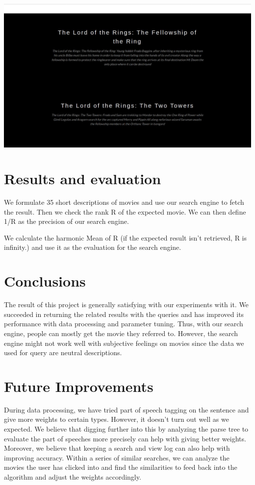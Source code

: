 \documentclass[letterpaper,10pt]{article}
\newenvironment{Figure}
  {\par\medskip\noindent\minipage{\linewidth}}
  {\endminipage\par\medskip}
\begin{document}
\begin{multicols}{2}
	\begin{Figure}
    	\center
  		\includegraphics[width=0.5\linewidth]{interface1.jpg}
	\end{Figure}

    \section{Results and evaluation}

    We formulate 35 short descriptions of movies and use our search engine to fetch the result. Then we check the rank R of the expected movie. We can then define 1/R as the precision of our search engine.

    We calculate the harmonic Mean of R (if the expected result isn’t retrieved, R is infinity.) and use it as the evaluation for the search engine.

    \section{Conclusions}

    The result of this project is generally satisfying with our experiments with it. We succeeded in returning the related results with the queries and has improved its performance with data processing and parameter tuning. Thus, with our search engine, people can mostly get the movie they referred to. However, the search engine might not work well with subjective feelings on movies since the data we used for query are neutral descriptions.

    \section{Future Improvements}
    During data processing, we have tried part of speech tagging on the sentence and give more weights to certain types. However, it doesn’t turn out well as we expected. We believe that digging further into this by analyzing the parse tree to evaluate the part of speeches more precisely can help with giving better weights.
    Moreover, we believe that keeping a search and view log can also help with improving accuracy. Within a series of similar searches, we can analyze the movies the user has clicked into and find the similarities to feed back into the algorithm and adjust the weights accordingly.


\end{multicols}
\end{document}
